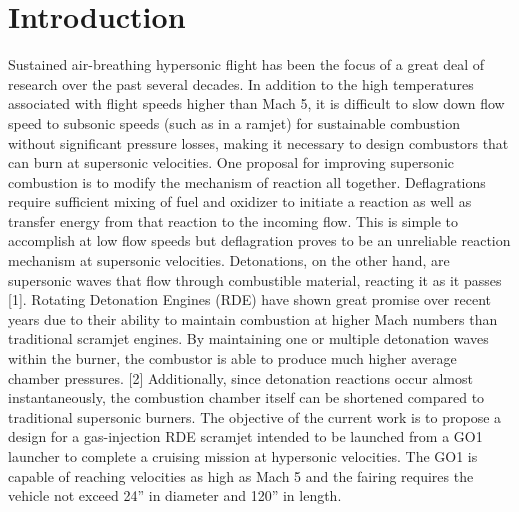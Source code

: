 \section{Introduction}
Sustained air-breathing hypersonic flight has been the focus of a great deal of research over the past several decades. In addition to the high temperatures associated with flight speeds higher than Mach 5, it is difficult to slow down flow speed to subsonic speeds (such as in a ramjet) for sustainable combustion without significant pressure losses, making it necessary to design combustors that can burn at supersonic velocities. One proposal for improving supersonic combustion is to modify the mechanism of reaction all together. Deflagrations require sufficient mixing of fuel and oxidizer to initiate a reaction as well as transfer energy from that reaction to the incoming flow. This is simple to accomplish at low flow speeds but deflagration proves to be an unreliable reaction mechanism at supersonic velocities. Detonations, on the other hand, are supersonic waves that flow through combustible material, reacting it as it passes [1]. Rotating Detonation Engines (RDE) have shown great promise over recent years due to their ability to maintain combustion at higher Mach numbers than traditional scramjet engines. By maintaining one or multiple detonation waves within the burner, the combustor is able to produce much higher average chamber pressures. [2] Additionally, since detonation reactions occur almost instantaneously, the combustion chamber itself can be shortened compared to traditional supersonic burners. The objective of the current work is to propose a design for a gas-injection RDE scramjet intended to be launched from a GO1 launcher to complete a cruising mission at hypersonic velocities. The GO1 is capable of reaching velocities as high as Mach 5 and the fairing requires the vehicle not exceed 24” in diameter and 120” in length. 